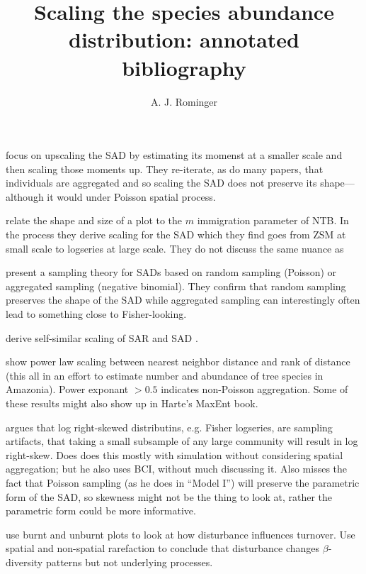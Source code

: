 \documentclass[12pt]{article}
\title{Scaling the species abundance distribution: annotated
  bibliography}
\author{A. J. Rominger}
\begin{document}
\maketitle

\citet{bordaDeAgua2012} focus on upscaling the SAD by estimating its
momenst at a smaller scale and then scaling those moments up.  They
re-iterate, as do many papers, that individuals are aggregated and so
scaling the SAD does not preserve its shape---although it would under
Poisson spatial process.

\citet{chisholm2009} relate the shape and size of a plot to the $m$
immigration parameter of NTB. In the process they derive scaling for
the SAD which they find goes from ZSM at small scale to logseries at
large scale. They do not discuss the same nuance as
\citet{rosindell2013}

\citet{green2007} present a sampling theory for SADs based on random
sampling (Poisson) or aggregated sampling (negative binomial). They
confirm that random sampling preserves the shape of the SAD while
aggregated sampling can interestingly often lead to something close to
Fisher-looking.

\citet{harte1999} derive self-similar scaling of SAR and SAD
\citep[but see][who says they did it wrong for SAD]{pueyo2006}.

\citet{hubbell2008} show power law scaling between nearest neighbor
distance and rank of distance (this all in an effort to estimate
number and abundance of tree species in Amazonia). Power exponant
$>0.5$ indicates non-Poisson aggregation.  Some of these results might
also show up in Harte's MaxEnt book.

\citet{mcgill2003} argues that log right-skewed distributins,
e.g. Fisher logseries, are sampling artifacts, that taking a small
subsample of any large community will result in log right-skew. Does
does this mostly with simulation without considering spatial
aggregation; but he also uses BCI, without much discussing it. Also
misses the fact that Poisson sampling (as he does in ``Model I'') will
preserve the parametric form of the SAD, so skewness might not be the
thing to look at, rather the parametric form could be more
informative.

\citet{myers2015} use burnt and unburnt plots to look at how
disturbance influences turnover. Use spatial and non-spatial
rarefaction to conclude that disturbance changes $\beta$-diversity
patterns but not underlying processes.
\end{document}
